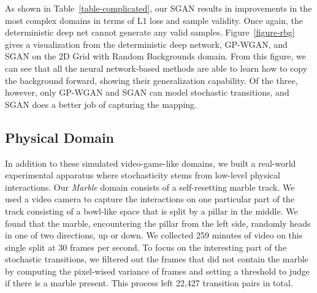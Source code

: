 \documentclass[letterpaper]{article} %
\begin{document}
As shown in Table~\ref{table-complicated}, our SGAN results in improvements in the most complex domains in terms of L1 loss and sample validity.
Once again, the deterministic deep net cannot generate any valid samples. Figure~\ref{figure-rbg} gives a visualization from the deterministic deep network, GP-WGAN, and SGAN on the 2D Grid with Random Backgrounds domain. From this figure, we can see that all the neural network-based methods are able to learn how to copy the background forward, showing their generalization capability. Of the three, however, only GP-WGAN and SGAN can model stochastic transitions, and SGAN does a better job of capturing the mapping.

\subsection{Physical Domain}

In addition to these simulated video-game-like domains, we built a real-world experimental apparatus where stochasticity stems from low-level physical interactions. Our \emph{Marble} domain consists of a self-resetting marble track. We used a video camera to capture the interactions on one particular part of the track consisting of a bowl-like space that is split by a pillar in the middle. We found that the marble, encountering the pillar from the left side, randomly heads in one of two directions, up or down. We collected 259 minutes of video on this single split at 30 frames per second. To focus on the interesting part of the stochastic transitions, we filtered out the frames that did not contain the marble by computing the pixel-wised variance of frames and setting a threshold to judge if there is a marble present. This process left 22,427 transition pairs in total.
\end{document}
